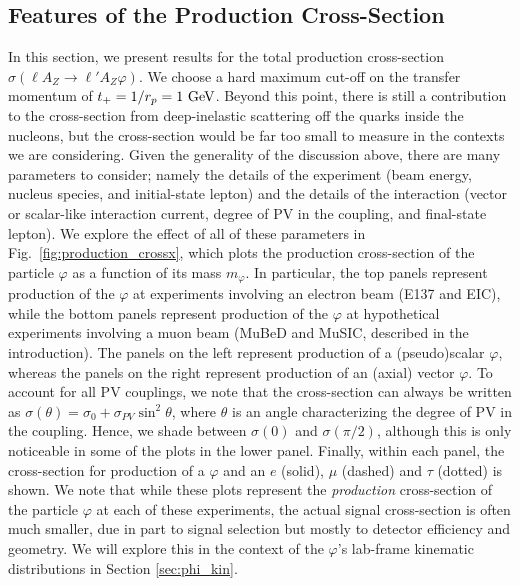 \subsection{Features of the Production Cross-Section}

In this section, we present results for the total production cross-section $\sigma(\ell A_Z\rightarrow \ell'A_Z\varphi)$. We choose a hard maximum cut-off on the transfer momentum of $t_+ = 1/r_p = 1~{\rm GeV}$. Beyond this point, there is still a contribution to the cross-section from deep-inelastic scattering off the quarks inside the nucleons, but the cross-section would be far too small to measure in the contexts we are considering. Given the generality of the discussion above, there are many parameters to consider; namely the details of the experiment (beam energy, nucleus species, and initial-state lepton) and the details of the interaction (vector or scalar-like interaction current, degree of PV in the coupling, and final-state lepton). We explore the effect of all of these parameters in Fig.~\ref{fig:production_crossx}, which plots the production cross-section of the particle $\varphi$ as a function of its mass $m_\varphi$. In particular, the top panels represent production of the $\varphi$ at experiments involving an electron beam (E137 and EIC), while the bottom panels represent production of  the $\varphi$ at hypothetical experiments involving a muon beam (MuBeD and MuSIC, described in the introduction). The panels on the left represent production of a (pseudo)scalar $\varphi$, whereas the panels on the right represent production of an (axial) vector $\varphi$. To account for all PV couplings, we note that the cross-section can always be written as $\sigma(\theta) = \sigma_0 + \sigma_{PV}\sin^2{\theta}$, where $\theta$ is an angle characterizing the degree of PV in the coupling. Hence, we shade between $\sigma(0)$ and $\sigma(\pi/2)$, although this is only noticeable in some of the plots in the lower panel. Finally, within each panel, the cross-section for production of a $\varphi$ and an $e$ (solid), $\mu$ (dashed) and $\tau$ (dotted) is shown. We note that while these plots represent the {\it production} cross-section of the particle $\varphi$ at each of these experiments, the actual signal cross-section is often much smaller, due in part to signal selection but mostly to detector efficiency and geometry. We will explore this in the context of the $\varphi$'s lab-frame kinematic distributions in Section \ref{sec:phi_kin}.
